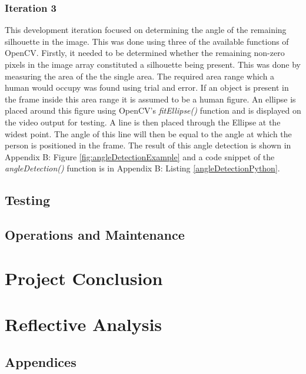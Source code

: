 \documentclass[11pt,a4paper]{report}
\begin{document}
\subsection{Iteration 3}

This development iteration focused on determining the angle of the remaining silhouette in the image. This was done using three of the available functions of OpenCV. Firstly, it needed to be determined whether the remaining non-zero pixels in the image array constituted a silhouette being present. This was done by measuring the area of the the single area. The required area range which a human would occupy was found using trial and error. If an object is present in the frame inside this area range it is assumed to be a human figure. An ellipse is placed around this figure using OpenCV's \textit{fitEllipse()} function and is displayed on the video output for testing. A line is then placed through the Ellipse at the widest point. The angle of this line will then be equal to the angle at which the person is positioned in the frame. The result of this angle detection is shown in Appendix B: Figure \ref{fig:angleDetectionExample} and a code snippet of the \textit{angleDetection()} function is in Appendix B: Listing \ref{angleDetectionPython}.

\pagebreak
\section{Testing}



\section{Operations and Maintenance}

\chapter{Project Conclusion}

\chapter{Reflective Analysis}

\renewcommand\bibname{References}

\pagebreak
\clearpage

\appendix
\section{Appendices}
\end{document}
